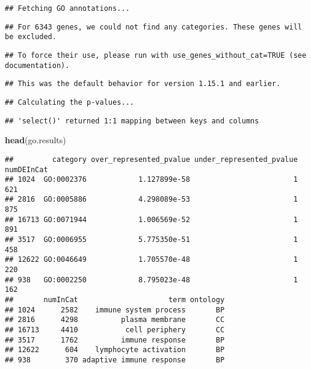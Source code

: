 \documentclass[
]{article}
\newenvironment{Shaded}{\begin{snugshade}}{\end{snugshade}}
\newcommand{\KeywordTok}[1]{\textcolor[rgb]{0.13,0.29,0.53}{\textbf{#1}}}
\newcommand{\NormalTok}[1]{#1}
\begin{document}
\begin{verbatim}
## Fetching GO annotations...
\end{verbatim}

\begin{verbatim}
## For 6343 genes, we could not find any categories. These genes will be excluded.
\end{verbatim}

\begin{verbatim}
## To force their use, please run with use_genes_without_cat=TRUE (see documentation).
\end{verbatim}

\begin{verbatim}
## This was the default behavior for version 1.15.1 and earlier.
\end{verbatim}

\begin{verbatim}
## Calculating the p-values...
\end{verbatim}

\begin{verbatim}
## 'select()' returned 1:1 mapping between keys and columns
\end{verbatim}

\begin{Shaded}
\begin{Highlighting}[]
\KeywordTok{head}\NormalTok{(go.results)}
\end{Highlighting}
\end{Shaded}

\begin{verbatim}
##         category over_represented_pvalue under_represented_pvalue numDEInCat
## 1024  GO:0002376            1.127899e-58                        1        621
## 2816  GO:0005886            4.298089e-53                        1        875
## 16713 GO:0071944            1.006569e-52                        1        891
## 3517  GO:0006955            5.775350e-51                        1        458
## 12622 GO:0046649            1.705570e-48                        1        220
## 938   GO:0002250            8.795023e-48                        1        162
##       numInCat                     term ontology
## 1024      2582    immune system process       BP
## 2816      4298          plasma membrane       CC
## 16713     4410           cell periphery       CC
## 3517      1762          immune response       BP
## 12622      604    lymphocyte activation       BP
## 938        370 adaptive immune response       BP
\end{verbatim}
\end{document}
